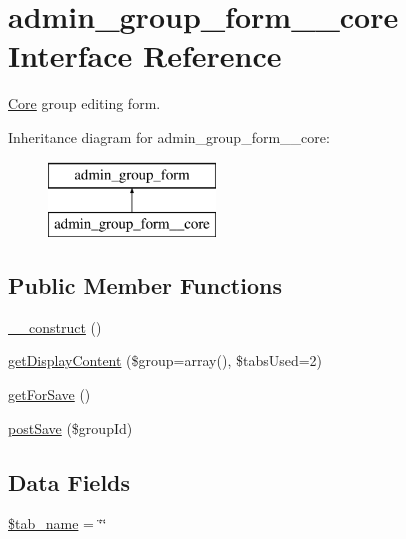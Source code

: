 \hypertarget{classadmin__group__form____core}{\section{admin\-\_\-group\-\_\-form\-\_\-\-\_\-core Interface Reference}
\label{classadmin__group__form____core}
}


\hyperlink{namespace_core}{Core} group editing form.  


Inheritance diagram for admin\-\_\-group\-\_\-form\-\_\-\-\_\-core\-:\begin{figure}[H]
\begin{center}
\leavevmode
\includegraphics[height=2.000000cm]{classadmin__group__form____core}
\end{center}
\end{figure}
\subsection*{Public Member Functions}
\begin{DoxyCompactItemize}
\item 
\hyperlink{classadmin__group__form____core_a095c5d389db211932136b53f25f39685}{\-\_\-\-\_\-construct} ()
\item 
\hyperlink{classadmin__group__form____core_a083de15a97f5e0a0ef60de656f8da320}{get\-Display\-Content} (\$group=array(), \$tabs\-Used=2)
\item 
\hyperlink{classadmin__group__form____core_aa584200e117d7f02d4fabc05b109e51f}{get\-For\-Save} ()
\item 
\hyperlink{classadmin__group__form____core_a5f418ff5a71edf7004cca91977f98074}{post\-Save} (\$group\-Id)
\end{DoxyCompactItemize}
\subsection*{Data Fields}
\begin{DoxyCompactItemize}
\item 
\hyperlink{classadmin__group__form____core_a924f0502d852ff2259cef00e4fa12d94}{\$tab\-\_\-name} = \char`\"{}\char`\"{}
\end{DoxyCompactItemize}
